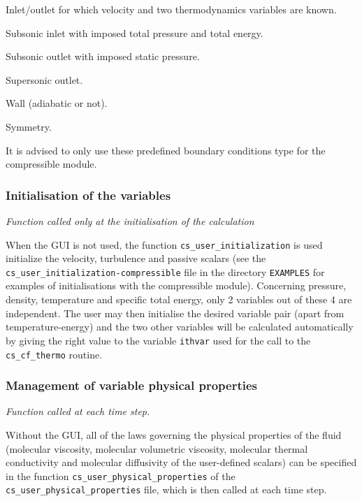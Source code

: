 \begin{list}{-}{}
  \item Inlet/outlet for which velocity and two thermodynamics variables are known.
  \item Subsonic inlet with imposed total pressure and total energy.
  \item Subsonic outlet with imposed static pressure.
  \item Supersonic outlet.
  \item Wall (adiabatic or not).
  \item Symmetry.
\end{list}

It is advised to only use these predefined boundary conditions type for the compressible module.

\subsubsection{Initialisation of the variables}

\noindent
\textit{Function called only at the initialisation of the calculation}

When the GUI is not used, the function \texttt{cs\_user\_initialization} is used
initialize the velocity, turbulence and passive scalars (see
the \texttt{cs\_user\_initialization-compressible} file in the directory \texttt{EXAMPLES}
for examples of initialisations with the compressible module). Concerning
pressure, density, temperature and specific total energy, only 2 variables out
of these 4 are independent. The user may then initialise the desired variable pair
(apart from temperature-energy) and the two other variables will be
calculated automatically by giving the right value to the variable
\texttt{ithvar} used for the call to the \texttt{cs\_cf\_thermo} routine.

\subsubsection{Management of variable physical properties}

\noindent
\textit{Function called at each time step.}

Without the GUI, all of the laws governing the physical properties of the fluid
(molecular viscosity, molecular volumetric viscosity, molecular thermal conductivity and
molecular diffusivity of the user-defined scalars) can be specified in the function \texttt{cs\_user\_physical\_properties} of
the \texttt{cs\_user\_physical\_properties} file,
which is then called at each time step. %

